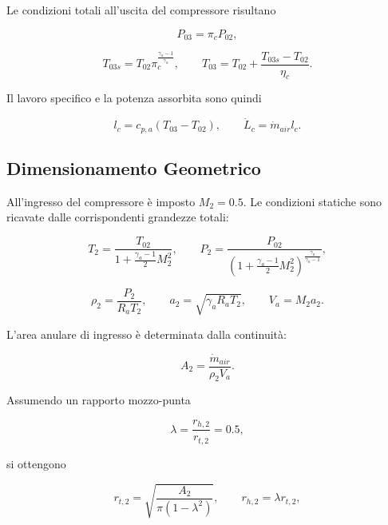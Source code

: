 Le condizioni totali all'uscita del compressore risultano

\begin{equation*}
P_{03}=\pi_c P_{02},
\end{equation*}

\begin{equation*}
T_{03s}=T_{02}\pi_c^{\frac{\gamma_a-1}{\gamma_a}},
\qquad
T_{03}=T_{02}+\frac{T_{03s}-T_{02}}{\eta_c}.
\end{equation*}

Il lavoro specifico e la potenza assorbita sono quindi

\begin{equation*}
l_c=c_{p,a}(T_{03}-T_{02}),
\qquad
\dot{L}_c=\dot{m}_{air}l_c.
\end{equation*}


\subsection{Dimensionamento Geometrico}

All'ingresso del compressore è imposto $M_2=0.5$. Le condizioni statiche
sono ricavate dalle corrispondenti grandezze totali:

\begin{equation*}
T_2=
\frac{T_{02}}
{1+\frac{\gamma_a-1}{2}M_2^2},
\qquad
P_2=
\frac{P_{02}}
{\left(1+\frac{\gamma_a-1}{2}M_2^2\right)^
{\frac{\gamma_a}{\gamma_a-1}}},
\end{equation*}

\begin{equation*}
\rho_2=\frac{P_2}{R_aT_2},
\qquad
a_2=\sqrt{\gamma_aR_aT_2},
\qquad
V_a=M_2a_2.
\end{equation*}

L'area anulare di ingresso è determinata dalla continuità:

\begin{equation*}
A_2=\frac{\dot{m}_{air}}{\rho_2V_a}.
\end{equation*}

Assumendo un rapporto mozzo-punta

\begin{equation*}
\lambda=\frac{r_{h,2}}{r_{t,2}}=0.5,
\end{equation*}

si ottengono

\begin{equation*}
r_{t,2}=
\sqrt{\frac{A_2}{\pi(1-\lambda^2)}},
\qquad
r_{h,2}=\lambda r_{t,2},
\end{equation*}

